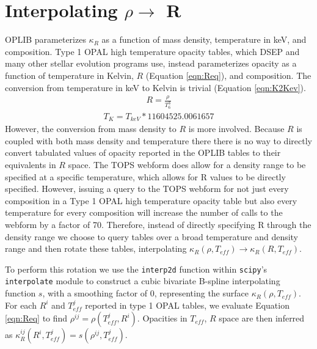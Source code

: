 \section{Interpolating $\rho \rightarrow $ R}\label{apx:interp}
OPLIB parameterizes $\kappa_{R}$ as a function of mass density, temperature in keV,
and composition. Type 1 OPAL high temperature opacity tables, which DSEP and
many other stellar evolution programs use, instead parameterizes opacity as a function
of temperature in Kelvin, $R$ (Equation \ref{eqn:Req}), and composition. The
conversion from temperature in keV to Kelvin is trivial (Equation
\ref{eqn:K2Kev}).
\begin{align}\label{eqn:Req}
	R = \frac{\rho}{T_{6}^{3}}
\end{align}
\begin{align}\label{eqn:K2Kev}
	T_{K} = T_{keV} * 11604525.0061657
\end{align}
However, the conversion from mass density to $R$ is more involved. Because $R$
is coupled with both mass density and temperature there there is no way to
directly convert tabulated values of opacity reported in the OPLIB tables to
their equivalents in $R$ space. The TOPS webform does allow for a
density range to be specified at a specific temperature, which allows for R
values to be directly specified. However, issuing a query to the TOPS webform
for not just every composition in a Type 1 OPAL high temperature opacity table
but also every temperature for every composition will increase the number of
calls to the webform by a factor of 70. Therefore, instead of directly
specifying R through the density range we choose to query tables over a
broad temperature and density range and then rotate these tables,
interpolating $\kappa_{R}(\rho,T_{eff}) \rightarrow \kappa_{R}(R,T_{eff})$. 


To perform this rotation we use the \texttt{interp2d} function within
\texttt{scipy}'s \texttt{interpolate} \citep{2020SciPy-NMeth} module to
construct a cubic bivariate B-spline \citep{Dierckx1981} interpolating function
$s$, with a smoothing factor of 0, representing the surface $\kappa_{R}(\rho,
T_{eff})$. For each $R^{i}$ and $T^{j}_{eff}$ reported in type 1 OPAL tables,
we evaluate Equation \ref{eqn:Req} to find $\rho^{ij} =
\rho(T^{j}_{eff},R^{i})$.  Opacities in $T_{eff}$, $R$ space are then inferred
as $\kappa^{ij}_{R}(R^{i},T^{j}_{eff}) = s(\rho^{ij}, T^{j}_{eff})$. 

